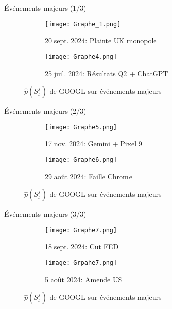 \documentclass[aspectratio=169]{beamer}  %
\begin{document}
\begin{frame}{Événements majeurs (1/3)}
    \begin{figure}
        \centering
        \begin{subfigure}[b]{0.48\textwidth}
            \texttt{[image: Graphe\_1.png]}
            \caption{20 sept. 2024: Plainte UK monopole}
        \end{subfigure}
        \hfill
        \begin{subfigure}[b]{0.48\textwidth}
            \texttt{[image: Graphe4.png]}
            \caption{25 juil. 2024: Résultats Q2 + ChatGPT}
        \end{subfigure}
        \caption{$\hat{p}(S_t^j)$ de GOOGL sur événements majeurs}
    \end{figure}
\end{frame}

\begin{frame}{Événements majeurs (2/3)}
    \begin{figure}
        \centering
        \begin{subfigure}[b]{0.48\textwidth}
            \texttt{[image: Graphe5.png]}
            \caption{17 nov. 2024: Gemini + Pixel 9}
        \end{subfigure}
        \hfill
        \begin{subfigure}[b]{0.48\textwidth}
            \texttt{[image: Graphe6.png]}
            \caption{29 août 2024: Faille Chrome}
        \end{subfigure}
        \caption{$\hat{p}(S_t^j)$ de GOOGL sur événements majeurs}
    \end{figure}
\end{frame}

\begin{frame}{Événements majeurs (3/3)}
    \begin{figure}
        \centering
        \begin{subfigure}[b]{0.48\textwidth}
            \texttt{[image: Graphe7.png]}
            \caption{18 sept. 2024: Cut FED}
        \end{subfigure}
        \hfill
        \begin{subfigure}[b]{0.48\textwidth}
            \texttt{[image: Grpahe7.png]}
            \caption{5 août 2024: Amende US}
        \end{subfigure}
        \caption{$\hat{p}(S_t^j)$ de GOOGL sur événements majeurs}
    \end{figure}
\end{frame}
\end{document}

